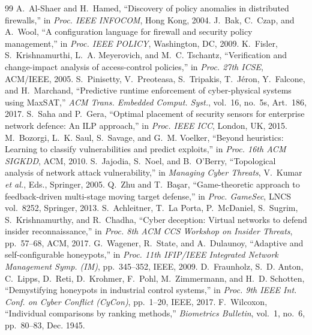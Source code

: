 \documentclass[10pt,twocolumn]{article}
\newcommand{\etal}{\textit{et al.}}
\begin{document}
\begin{thebibliography}{99}
 A.~Al-Shaer and H.~Hamed, ``Discovery of policy anomalies in distributed firewalls,'' in \textit{Proc. IEEE INFOCOM}, Hong Kong, 2004.
 J.~Bak, C.~Czap, and A.~Wool, ``A configuration language for firewall and security policy management,'' in \textit{Proc. IEEE POLICY}, Washington, DC, 2009.
 K.~Fisler, S.~Krishnamurthi, L.~A. Meyerovich, and M.~C. Tschantz, ``Verification and change-impact analysis of access-control policies,'' in \textit{Proc. 27th ICSE}, ACM/IEEE, 2005.
 S.~Pinisetty, V.~Preoteasa, S.~Tripakis, T.~J\'eron, Y.~Falcone, and H.~Marchand, ``Predictive runtime enforcement of cyber-physical systems using MaxSAT,'' \textit{ACM Trans. Embedded Comput. Syst.}, vol.~16, no.~5s, Art.~186, 2017.
 S.~Saha and P.~Gera, ``Optimal placement of security sensors for enterprise network defence: An ILP approach,'' in \textit{Proc. IEEE ICC}, London, UK, 2015.
 M.~Bozorgi, L.~K. Saul, S.~Savage, and G.~M. Voelker, ``Beyond heuristics: Learning to classify vulnerabilities and predict exploits,'' in \textit{Proc. 16th ACM SIGKDD}, ACM, 2010.
 S.~Jajodia, S.~Noel, and B.~O'Berry, ``Topological analysis of network attack vulnerability,'' in \textit{Managing Cyber Threats}, V.~Kumar \etal, Eds., Springer, 2005.
 Q.~Zhu and T.~Ba\c{s}ar, ``Game-theoretic approach to feedback-driven multi-stage moving target defense,'' in \textit{Proc. GameSec}, LNCS vol.~8252, Springer, 2013.
 S.~Achleitner, T.~La Porta, P.~McDaniel, S.~Sugrim, S.~Krishnamurthy, and R.~Chadha, ``Cyber deception: Virtual networks to defend insider reconnaissance,'' in \textit{Proc. 8th ACM CCS Workshop on Insider Threats}, pp.~57--68, ACM, 2017.
 G.~Wagener, R.~State, and A.~Dulaunoy, ``Adaptive and self-configurable honeypots,'' in \textit{Proc. 11th IFIP/IEEE Integrated Network Management Symp. (IM)}, pp.~345--352, IEEE, 2009.
 D.~Fraunholz, S.~D. Anton, C.~Lipps, D.~Reti, D.~Krohmer, F.~Pohl, M.~Zimmermann, and H.~D. Schotten, ``Demystifying honeypots in industrial control systems,'' in \textit{Proc. 9th IEEE Int. Conf. on Cyber Conflict (CyCon)}, pp.~1--20, IEEE, 2017.
 F.~Wilcoxon, ``Individual comparisons by ranking methods,'' \textit{Biometrics Bulletin}, vol.~1, no.~6, pp.~80--83, Dec. 1945.
\end{thebibliography}
\end{document}
